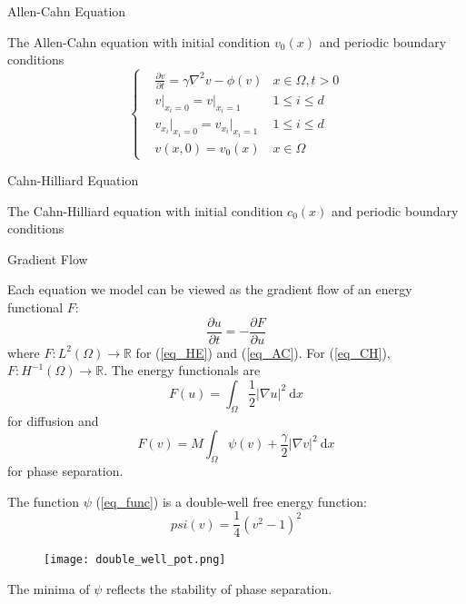 \documentclass{beamer}
\theoremstyle{remark}
\newcommand{\ud}{\mathrm{d}}
\begin{document}
\begin{frame}{Allen-Cahn Equation}
	
	The Allen-Cahn equation with initial condition $v_0(x)$ and periodic boundary conditions
	\begin{equation} \label{eq_AC}
		\left\{
			\begin{split}
				&\frac{\partial v}{\partial t}=\gamma\nabla^2v-\phi(v)&x\in\Omega,t>0\\
				&v\big|_{x_i=0}=v\big|_{x_i=1}&1\le i\le d\\
				&v_{x_i}\big|_{x_i=0}=v_{x_i}\big|_{x_i=1}&1\le i\le d\\
				&v(x,0)=v_0(x)&x\in\Omega
			\end{split}	
		\right.
	\end{equation}
	
\end{frame}

\begin{frame}{Cahn-Hilliard Equation}
	
	The Cahn-Hilliard equation with initial condition $c_0(x)$ and periodic boundary conditions


\end{frame}

\begin{frame}{Gradient Flow}

	Each equation we model can be viewed as the gradient flow of an energy functional $F$: 
	\begin{equation}
		\frac{\partial u}{\partial t}=-\frac{\partial F}{\partial u}	
	\end{equation}
	where $F\colon L^2(\Omega)\to\mathbb{R}$ for (\ref{eq_HE}) and (\ref{eq_AC}). For (\ref{eq_CH}), $F\colon H^{-1}(\Omega)\to\mathbb{R}$. The energy functionals are 
	\begin{equation}
		F(u)=\int_\Omega\frac{1}{2}|\nabla u|^2~\ud x
	\end{equation}
	for diffusion and 
	\begin{equation} \label{eq_func}
		F(v)=M\int_\Omega \psi(v)+\frac{\gamma}{2}|\nabla v|^2~\ud x
	\end{equation}
	for phase separation.
	
\end{frame}

\begin{frame}
	The function $\psi$ (\ref{eq_func}) is a double-well free energy function:
	\begin{equation}
		psi(v)=\frac{1}{4}(v^2-1)^2
	\end{equation}

	\begin{figure}
		\begin{center}
			\texttt{[image: double\_well\_pot.png]}
		\end{center}
	\end{figure}

	The minima of $\psi$ reflects the stability of phase separation. 
\end{frame}
\end{document}
